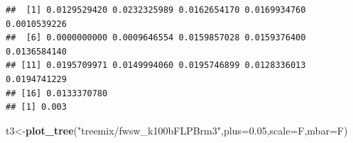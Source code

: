 \documentclass[]{article}
\newenvironment{Shaded}{\begin{snugshade}}{\end{snugshade}}
\newcommand{\KeywordTok}[1]{\textcolor[rgb]{0.13,0.29,0.53}{\textbf{#1}}}
\newcommand{\DataTypeTok}[1]{\textcolor[rgb]{0.13,0.29,0.53}{#1}}
\newcommand{\FloatTok}[1]{\textcolor[rgb]{0.00,0.00,0.81}{#1}}
\newcommand{\StringTok}[1]{\textcolor[rgb]{0.31,0.60,0.02}{#1}}
\newcommand{\NormalTok}[1]{#1}
\begin{document}
\begin{verbatim}
##  [1] 0.0129529420 0.0232325989 0.0162654170 0.0169934760 0.0010539226
##  [6] 0.0000000000 0.0009646554 0.0159857028 0.0159376400 0.0136584140
## [11] 0.0195709971 0.0149994060 0.0195746899 0.0128336013 0.0194741229
## [16] 0.0133370780
## [1] 0.003
\end{verbatim}

\begin{Shaded}
\begin{Highlighting}[]
\NormalTok{t3<-}\KeywordTok{plot_tree}\NormalTok{(}\StringTok{"treemix/fwsw_k100bFLPBrm3"}\NormalTok{,}\DataTypeTok{plus=}\FloatTok{0.05}\NormalTok{,}\DataTypeTok{scale=}\NormalTok{F,}\DataTypeTok{mbar=}\NormalTok{F)}
\end{Highlighting}
\end{Shaded}
\end{document}
